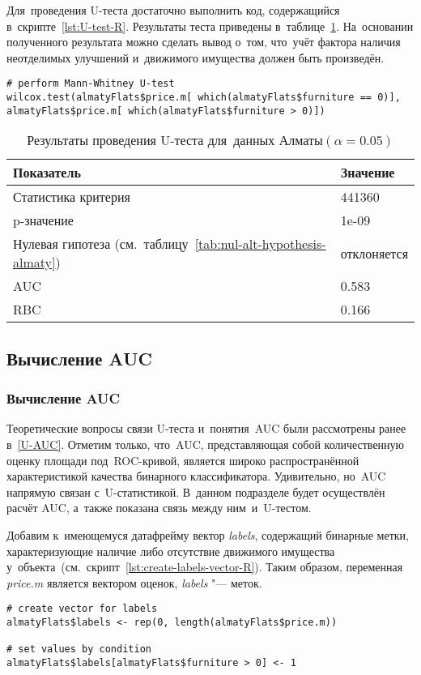 \documentclass[]{scrreprt}
\begin{document}
Для~проведения U-теста достаточно выполнить код, содержащийся в~скрипте~\ref{lst:U-test-R}. Результаты теста приведены в~таблице~\ref{tab:u-test-r-result}. На~основании полученного результата можно сделать вывод о~том, что~учёт фактора наличия неотделимых улучшений и~движимого имущества должен быть произведён.
%
\begin{lstlisting}[float, caption = Проведение U-теста для данных города Алматы, firstnumber=1, label= lst:U-test-R]
# perform Mann-Whitney U-test
wilcox.test(almatyFlats$price.m[ which(almatyFlats$furniture == 0)],
almatyFlats$price.m[ which(almatyFlats$furniture > 0)]) 
\end{lstlisting}
%
\begin{table}[ht]
	\caption{Результаты проведения U-теста для~данных Алматы$({\textstyle \alpha=0.05})$}\label{tab:u-test-r-result}
	\centering
	\begin{tabular}{ll}
		\hline
		Показатель&Значение\\
		\hline
		Статистика критерия&441360\\
		\hline
		p-значение&1e-09\\
		\hline
		Нулевая гипотеза (см.~таблицу~\ref{tab:nul-alt-hypothesis-almaty})&отклоняется\\
		\hline
		AUC&0.583\\
		\hline
		RBC&0.166\\
		\hline
	\end{tabular}
\end{table}
%
\subsection{Вычисление AUC}

\subsubsection{Вычисление AUC}\label{AUC-almaty}
Теоретические вопросы связи U-теста и~понятия~AUC были рассмотрены ранее в~\ref{U-AUC}. Отметим только, что~AUC, представляющая собой количественную оценку площади под~ROC-кривой, является широко распространённой характеристикой качества бинарного классификатора. Удивительно, но~AUC напрямую связан с~U-статистикой. В~данном подразделе будет осуществлён расчёт AUC, а~также показана связь между ним~и~U-тестом.

Добавим к~имеющемуся датафрейму вектор \textit{labels}, содержащий бинарные метки, характеризующие наличие либо отсутствие движимого имущества у~объекта~(см.~скрипт~\ref{lst:create-labels-vector-R}). Таким образом, переменная \textit{price.m} является вектором оценок, \textit{labels} "--- меток.
%
\begin{lstlisting}[float, caption = Добавление переменной с~бинарными метками, firstnumber=1, label= lst:create-labels-vector-R]
# create vector for labels
almatyFlats$labels <- rep(0, length(almatyFlats$price.m))

# set values by condition
almatyFlats$labels[almatyFlats$furniture > 0] <- 1
\end{lstlisting}
%
\end{document}
